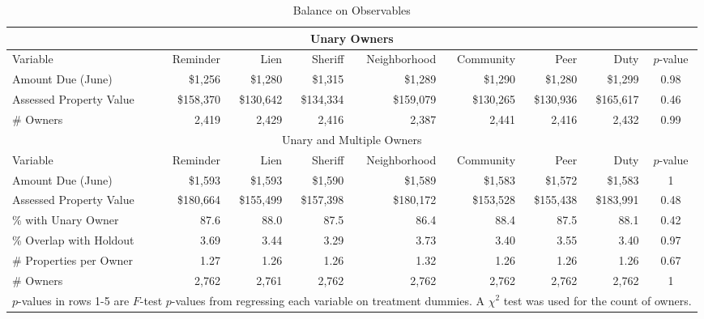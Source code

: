 \documentclass[12pt]{article}
\begin{document}
\begin{appendix}
\begin{sidewaystable}[htbp]
\centering
\caption{Balance on Observables}
\label{balance2}
\begin{tabular}{lrrrrrrrc}
\hline
\multicolumn{9}{c}{Unary Owners} \\
  \hline
Variable & Reminder & Lien & Sheriff & Neighborhood & Community & Peer & Duty & $p$-value \\ 
   \hline
Amount Due (June) & \$1,256 & \$1,280 & \$1,315 & \$1,289 & \$1,290 & \$1,280 & \$1,299 & 0.98 \\ 
  Assessed Property Value & \$158,370 & \$130,642 & \$134,334 & \$159,079 & \$130,265 & \$130,936 & \$165,617 & 0.46 \\ 
  \# Owners & 2,419 & 2,429 & 2,416 & 2,387 & 2,441 & 2,416 & 2,432 & 0.99 \\ 
  \hline
\multicolumn{9}{c}{Unary and Multiple Owners} \\
  \hline
Variable & Reminder & Lien & Sheriff & Neighborhood & Community & Peer & Duty & $p$-value \\ 
   \hline
Amount Due (June) & \$1,593 & \$1,593 & \$1,590 & \$1,589 & \$1,583 & \$1,572 & \$1,583 & 1 \\ 
  Assessed Property Value & \$180,664 & \$155,499 & \$157,398 & \$180,172 & \$153,528 & \$155,438 & \$183,991 & 0.48 \\ 
  \% with Unary Owner & 87.6 & 88.0 & 87.5 & 86.4 & 88.4 & 87.5 & 88.1 & 0.42 \\ 
  \% Overlap with Holdout & 3.69 & 3.44 & 3.29 & 3.73 & 3.40 & 3.55 & 3.40 & 0.97 \\ 
  \# Properties per Owner & 1.27 & 1.26 & 1.26 & 1.32 & 1.26 & 1.26 & 1.26 & 0.67 \\ 
  \# Owners & 2,762 & 2,761 & 2,762 & 2,762 & 2,762 & 2,762 & 2,762 & 1 \\ 
  \hline
\multicolumn{9}{l}{\scriptsize{$p$-values in rows 1-5 are $F$-test $p$-values from regressing each variable on treatment dummies. A $\chi^2$ test was used for the count of owners.}} \\
\end{tabular}
\end{sidewaystable}



\end{appendix}
\end{document}
